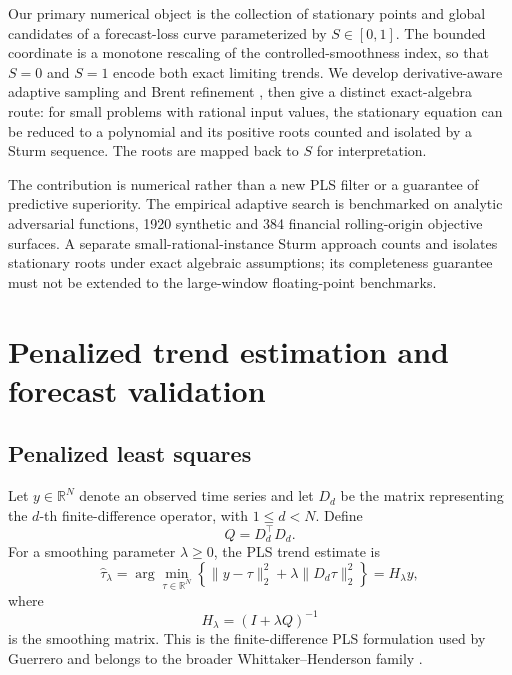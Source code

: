 \documentclass[english]{smcca}
\newcommand{\R}{\mathbb{R}}
\begin{document}
Our primary numerical object is the collection of stationary points and global candidates of a forecast-loss curve parameterized by $S\in[0,1]$. The bounded coordinate is a monotone rescaling of the controlled-smoothness index, so that $S=0$ and $S=1$ encode both exact limiting trends. We develop derivative-aware adaptive sampling and Brent refinement \cite{brent1971zero}, then give a distinct exact-algebra route: for small problems with rational input values, the stationary equation can be reduced to a polynomial and its positive roots counted and isolated by a Sturm sequence. The roots are mapped back to $S$ for interpretation. 

The contribution is numerical rather than a new PLS filter
or a guarantee of predictive superiority. The empirical adaptive
search is benchmarked on analytic adversarial functions, 1920
synthetic and 384 financial rolling-origin objective surfaces.
A separate small-rational-instance Sturm approach counts and
isolates stationary roots under exact algebraic assumptions;
its completeness guarantee must not be extended to the
large-window floating-point benchmarks.

\section{Penalized trend estimation and forecast validation}

\subsection{Penalized least squares}

Let \(y\in\R^N\) denote an observed time series and let \(D_d\) be the matrix representing the \(d\)-th finite-difference operator, with \(1\le d<N\). Define
\[
Q=D_d^\top D_d.
\]
For a smoothing parameter \(\lambda\ge0\), the PLS trend estimate is
\begin{equation}
\widehat{\tau}_\lambda
=
\arg\min_{\tau\in\R^N}
\left\{
\|y-\tau\|_2^2
+
\lambda\|D_d\tau\|_2^2
\right\}
=
H_\lambda y,
\label{eq:pls}
\end{equation}
where
\begin{equation}
H_\lambda=(I+\lambda Q)^{-1}
\label{eq:smoother}
\end{equation}
is the smoothing matrix. This is the finite-difference PLS formulation used by Guerrero \cite{guerrero2007penalized} and belongs to the broader Whittaker--Henderson family \cite{whittaker1923graduation,weinert2007wh}.
\end{document}
